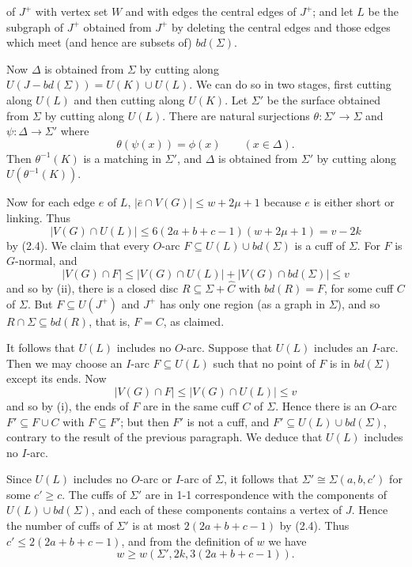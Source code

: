 \noindent of $J^+$ with vertex set $W$ and with edges the central edges of $J^+$; and let $L$ be the subgraph of $J^+$ obtained from $J^+$ by deleting the central edges and those edges which meet (and hence are subsets of) $bd(\Sigma)$.

Now $\Delta$ is obtained from $\Sigma$ by cutting along $U(J - bd(\Sigma)) = U(K) \cup U(L)$. We can do so in two stages, first cutting along $U(L)$ and then cutting along $U(K)$. Let $\Sigma'$ be the surface obtained from $\Sigma$ by cutting along $U(L)$. There are natural surjections $\theta \colon \Sigma' \to \Sigma$ and $\psi \colon \Delta \to \Sigma'$ where
\begin{equation*}
\theta(\psi(x)) = \phi(x) \qquad (x \in \Delta).
\end{equation*}
Then $\theta^{-1}(K)$ is a matching in $\Sigma'$, and $\Delta$ is obtained from $\Sigma'$ by cutting along $U(\theta^{-1}(K))$.

Now for each edge $e$ of $L$, $|\bar{e} \cap V(G)| \le w + 2\mu + 1$ because $e$ is either short or linking. Thus
\begin{equation*}
|V(G) \cap U(L)| \le 6(2a + b + c - 1)(w + 2\mu + 1) = v - 2k
\end{equation*}
by (2.4). We claim that every $O$-arc $F \subseteq U(L) \cup bd(\Sigma)$ is a cuff of $\Sigma$. For $F$ is $G$-normal, and
\begin{equation*}
|V(G) \cap F| \le |V(G) \cap U(L)| + |V(G) \cap bd(\Sigma)| \le v
\end{equation*}
and so by (ii), there is a closed disc $R \subseteq \Sigma + \hat{C}$ with $bd(R) = F$, for some cuff $C$ of $\Sigma$. But $F \subseteq U(J^+)$ and $J^+$ has only one region (as a graph in $\Sigma$), and so $R \cap \Sigma \subseteq bd(R)$, that is, $F = C$, as claimed.

It follows that $U(L)$ includes no $O$-arc. Suppose that $U(L)$ includes an $I$-arc. Then we may choose an $I$-arc $F \subseteq U(L)$ such that no point of $F$ is in $bd(\Sigma)$ except its ends. Now
\begin{equation*}
|V(G) \cap F| \le |V(G) \cap U(L)| \le v
\end{equation*}
and so by (i), the ends of $F$ are in the same cuff $C$ of $\Sigma$. Hence there is an $O$-arc $F' \subseteq F \cup C$ with $F \subseteq F'$; but then $F'$ is not a cuff, and $F' \subseteq U(L) \cup bd(\Sigma)$, contrary to the result of the previous paragraph. We deduce that $U(L)$ includes no $I$-arc.

Since $U(L)$ includes no $O$-arc or $I$-arc of $\Sigma$, it follows that $\Sigma' \cong \Sigma(a, b, c')$ for some $c' \ge c$. The cuffs of $\Sigma'$ are in 1-1 correspondence with the components of $U(L) \cup bd(\Sigma)$, and each of these components contains a vertex of $J$. Hence the number of cuffs of $\Sigma'$ is at most $2(2a + b + c - 1)$ by (2.4). Thus $c' \le 2(2a + b + c - 1)$, and from the definition of $w$ we have
\begin{equation*}
w \ge w(\Sigma', 2k, 3(2a + b + c - 1)).
\end{equation*}
